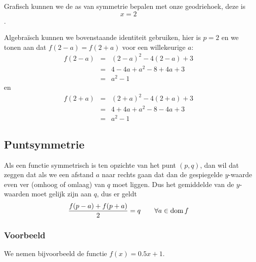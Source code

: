 \documentclass[12pt,twoside]{article}
\begin{document}
\begin{theorie}
Grafisch kunnen we de as van symmetrie bepalen met onze geodriehoek, deze is
$$x=2$$.

Algebraïsch kunnen we bovenstaande identiteit gebruiken, hier is $p=2$ en we tonen aan dat $f(2-a)=f(2+a)$ voor een willekeurige $a$:
\begin{eqnarray*}
  f(2-a) &=& (2-a)^2-4(2-a)+3\\
         &=& 4-4a+a^2-8+4a+3\\
         &=& a^2-1
\end{eqnarray*}
en
\begin{eqnarray*}
  f(2+a) &=& (2+a)^2-4(2+a)+3\\
         &=& 4+4a+a^2-8-4a+3\\
         &=& a^2-1
\end{eqnarray*}

\subsection{Puntsymmetrie}

Als een functie symmetrisch is ten opzichte van het punt $(p,q)$, dan wil dat zeggen dat als we een afstand $a$ naar rechts gaan dat dan de gespiegelde $y$-waarde even ver (omhoog of omlaag) van $q$ moet liggen. Dus het gemiddelde van de $y$-waarden moet gelijk zijn aan $q$, dus er geldt
$$\dfrac{f(p-a)+f(p+a)}{2}=q \qquad \forall a\in\dom f$$

\subsubsection*{Voorbeeld}

We nemen bijvoorbeeld de functie $f(x)=0.5x+1$.

\begin{center}
\end{center}


\end{theorie}
\end{document}
